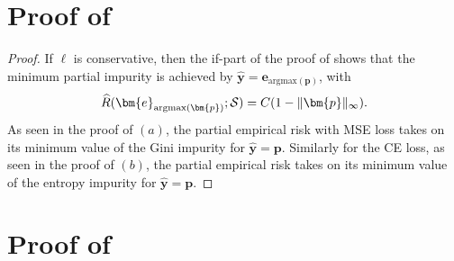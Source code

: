 \documentclass[letterpaper]{article} %
\newcommand{\bx}{{\bm{x}}}
\newcommand{\bp}{{\bm{p}}}
\newcommand{\by}{{\bm{y}}}
\newcommand{\be}{{\bm{e}}}
\newcommand{\T}{{\mathsf{T}}}
\newcommand{\cS}{{\cal{S}}}
\newcommand{\cD}{{\cal{D}}}
\newcommand{\WS}{{W_{\cal{S}}}}
\newcommand{\simplex}{\Delta}
\newcommand{\argmax}{\mathrm{argmax}}
\begin{document}
\section{Proof of }
\label{app:one-hot-predictions}
\ohp*
\begin{proof}
    If $\ell$ is conservative, then the if-part of the proof of  shows that the 
    minimum partial impurity is achieved by $\widehat{\by} = \be_{\argmax(\bp)}$, with
    \[
        \widehat{R}(\be_{\argmax(\bp)};\cS) = C(1-\|\bp\|_\infty).
    \]
    As seen in the proof of  $(a)$, the partial empirical risk with MSE loss takes on its minimum value of the Gini impurity for $\widehat{\by}=\bp$. 
    Similarly for the CE loss, as seen in the proof of  $(b)$, the partial empirical risk takes on its minimum value of the entropy impurity for $\widehat{\by}=\bp$.
\end{proof}


\section{Proof of }
\label{app:hoeffding}


    
\end{document}
